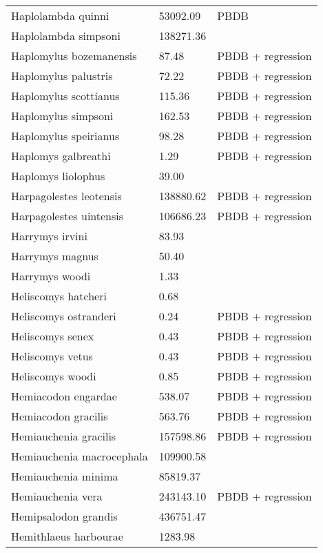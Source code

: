 \documentclass{article}
\begin{document}
\begin{center}
\begin{longtable}{p{} p{} p{}}
    Haplolambda quinni & 53092.09 & PBDB \\ 
    Haplolambda simpsoni & 138271.36 & \cite{Tedford1994} \\ 
    Haplomylus bozemanensis & 87.48 & PBDB + regression \\ 
    Haplomylus palustris & 72.22 & PBDB + regression \\ 
    Haplomylus scottianus & 115.36 & PBDB + regression \\ 
    Haplomylus simpsoni & 162.53 & PBDB + regression \\ 
    Haplomylus speirianus & 98.28 & PBDB + regression \\ 
    Haplomys galbreathi & 1.29 & PBDB + regression \\ 
    Haplomys liolophus & 39.00 & \cite{McKenna2011} \\ 
    Harpagolestes leotensis & 138880.62 & PBDB + regression \\ 
    Harpagolestes uintensis & 106686.23 & PBDB + regression \\ 
    Harrymys irvini & 83.93 & \cite{Tomiya2013} \\ 
    Harrymys magnus & 50.40 & \cite{Tomiya2013} \\ 
    Harrymys woodi & 1.33 & \cite{Kirk2011} \\ 
    Heliscomys hatcheri & 0.68 & \cite{Wilson2012} \\ 
    Heliscomys ostranderi & 0.24 & PBDB + regression \\ 
    Heliscomys senex & 0.43 & PBDB + regression \\ 
    Heliscomys vetus & 0.43 & PBDB + regression \\ 
    Heliscomys woodi & 0.85 & PBDB + regression \\ 
    Hemiacodon engardae & 538.07 & PBDB + regression \\ 
    Hemiacodon gracilis & 563.76 & PBDB + regression \\ 
    Hemiauchenia gracilis & 157598.86 & PBDB + regression \\ 
    Hemiauchenia macrocephala & 109900.58 & \cite{Smith2004} \\ 
    Hemiauchenia minima & 85819.37 & \cite{Tomiya2013} \\ 
    Hemiauchenia vera & 243143.10 & PBDB + regression \\ 
    Hemipsalodon grandis & 436751.47 & \cite{Scott1937} \\ 
    Hemithlaeus harbourae & 1283.98 & \cite{Loomis1932} \\ 

\end{longtable}
\end{center}
\end{document}
